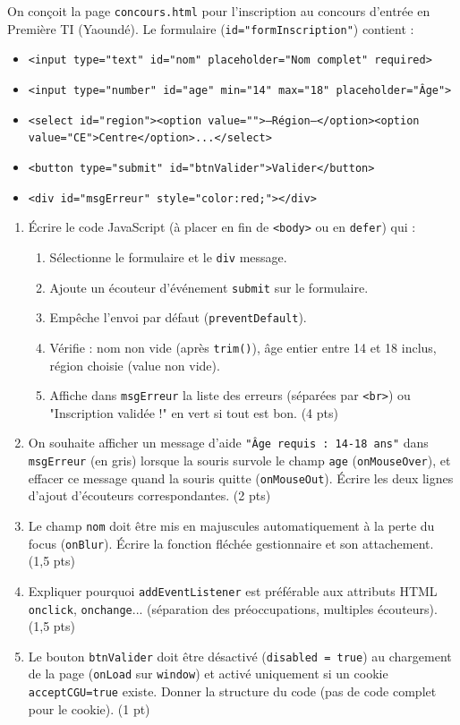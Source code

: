 \documentclass[11pt]{article}
\begin{document}
\begin{exercice}
On conçoit la page \texttt{concours.html} pour l'inscription au concours d'entrée en Première TI (Yaoundé). Le formulaire (\texttt{id="formInscription"}) contient :
\begin{itemize}
    \item \texttt{<input type="text" id="nom" placeholder="Nom complet" required>}
    \item \texttt{<input type="number" id="age" min="14" max="18" placeholder="Âge">}
    \item \texttt{<select id="region"><option value="">--Région--</option><option value="CE">Centre</option>...</select>}
    \item \texttt{<button type="submit" id="btnValider">Valider</button>}
    \item \texttt{<div id="msgErreur" style="color:red;"></div>}
\end{itemize}
\begin{enumerate}
    \item Écrire le code JavaScript (à placer en fin de \texttt{<body>} ou en \texttt{defer}) qui :
    \begin{enumerate}
        \item Sélectionne le formulaire et le \texttt{div} message.
        \item Ajoute un écouteur d'événement \texttt{submit} sur le formulaire.
        \item Empêche l'envoi par défaut (\texttt{preventDefault}).
        \item Vérifie : nom non vide (après \texttt{trim()}), âge entier entre 14 et 18 inclus, région choisie (value non vide).
        \item Affiche dans \texttt{msgErreur} la liste des erreurs (séparées par \texttt{<br>}) ou "Inscription validée !" en vert si tout est bon. (4 pts)
    \end{enumerate}
    \item On souhaite afficher un message d'aide \texttt{"Âge requis : 14-18 ans"} dans \texttt{msgErreur} (en gris) lorsque la souris survole le champ \texttt{age} (\texttt{onMouseOver}), et effacer ce message quand la souris quitte (\texttt{onMouseOut}). Écrire les deux lignes d'ajout d'écouteurs correspondantes. (2 pts)
    \item Le champ \texttt{nom} doit être mis en majuscules automatiquement à la perte du focus (\texttt{onBlur}). Écrire la fonction fléchée gestionnaire et son attachement. (1,5 pts)
    \item Expliquer pourquoi \texttt{addEventListener} est préférable aux attributs HTML \texttt{onclick}, \texttt{onchange}... (séparation des préoccupations, multiples écouteurs). (1,5 pts)
    \item Le bouton \texttt{btnValider} doit être désactivé (\texttt{disabled = true}) au chargement de la page (\texttt{onLoad} sur \texttt{window}) et activé uniquement si un cookie \texttt{acceptCGU=true} existe. Donner la structure du code (pas de code complet pour le cookie). (1 pt)
\end{enumerate}
\end{exercice}
\end{document}
